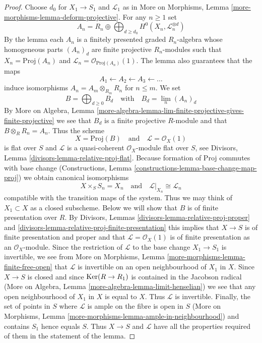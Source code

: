 \begin{proof}
Choose $d_0$ for $X_1 \to S_1$ and $\mathcal{L}_1$ as in
More on Morphisms, Lemma \ref{more-morphisms-lemma-deform-projective}.
For any $n \geq 1$ set
$$
A_n = R_n \oplus
\bigoplus\nolimits_{d \geq d_0} H^0(X_n, \mathcal{L}_n^{\otimes d})
$$
By the lemma each $A_n$ is a finitely presented graded $R_n$-algebra
whose homogeneous parts $(A_n)_d$ are finite projective $R_n$-modules
such that $X_n = \text{Proj}(A_n)$ and
$\mathcal{L}_n = \mathcal{O}_{\text{Proj}(A_n)}(1)$.
The lemma also guarantees that the maps
$$
A_1 \leftarrow A_2 \leftarrow A_3 \leftarrow \ldots
$$
induce isomorphisms $A_n = A_m \otimes_{R_m} R_n$ for $n \leq m$.
We set
$$
B = \bigoplus\nolimits_{d \geq 0} B_d
\quad\text{with}\quad
B_d = \lim_n (A_n)_d
$$
By More on Algebra, Lemma
\ref{more-algebra-lemma-lim-finite-projective-gives-finite-projective}
we see that $B_d$ is a finite projective $R$-module and that
$B \otimes_R R_n = A_n$. Thus the scheme
$$
X = \text{Proj}(B)
\quad\text{and}\quad
\mathcal{L} = \mathcal{O}_X(1)
$$
is flat over $S$ and $\mathcal{L}$ is a quasi-coherent $\mathcal{O}_X$-module
flat over $S$, see
Divisors, Lemma \ref{divisors-lemma-relative-proj-flat}.
Because formation of Proj commutes with base change
(Constructions, Lemma \ref{constructions-lemma-base-change-map-proj})
we obtain canonical isomorphisms
$$
X \times_S S_n = X_n
\quad\text{and}\quad
\mathcal{L}|_{X_n} \cong \mathcal{L}_n
$$
compatible with the transition maps of the system.
Thus we may think of $X_1 \subset X$ as a closed subscheme.
Below we will show that $B$ is of finite presentation over $R$.
By Divisors, Lemmas \ref{divisors-lemma-relative-proj-proper} and
\ref{divisors-lemma-relative-proj-finite-presentation}
this implies that $X \to S$ is of finite presentation
and proper and that $\mathcal{L} = \mathcal{O}_X(1)$
is of finite presentation as an $\mathcal{O}_X$-module.
Since the restriction of $\mathcal{L}$ to the base change
$X_1 \to S_1$ is invertible, we see from
More on Morphisms, Lemma \ref{more-morphisms-lemma-finite-free-open}
that $\mathcal{L}$ is invertible on an open neighbourhood of $X_1$ in $X$.
Since $X \to S$ is closed and since $\mathop{\mathrm{Ker}}(R \to R_1)$
is contained in the Jacobson radical
(More on Algebra, Lemma \ref{more-algebra-lemma-limit-henselian})
we see that any open neighbourhood of $X_1$ in $X$ is equal to $X$.
Thus $\mathcal{L}$ is invertible. Finally, the set of points in
$S$ where $\mathcal{L}$ is ample on the fibre is open in $S$
(More on Morphisms, Lemma \ref{more-morphisms-lemma-ample-in-neighbourhood})
and contains $S_1$ hence equals $S$. Thus $X \to S$ and $\mathcal{L}$
have all the properties required of them in the statement of the lemma.


\end{proof}

